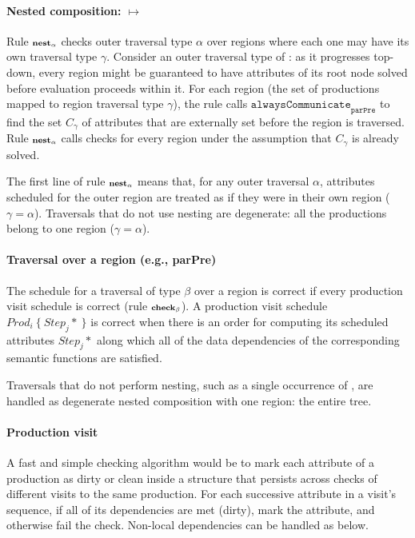\paragraph*{Nested composition: $\mapsto$}
Rule ${\scriptstyle\textbf {nest}_\alpha}$ checks outer traversal type $\alpha$ over regions where each one may have its own traversal type $\gamma$. Consider an outer traversal type of  : as it progresses top-down, every region might be guaranteed to have attributes of its root node solved before evaluation proceeds within it. For each region (the set of productions mapped to region traversal type $\gamma$), the rule calls $\texttt{alwaysCommunicate}_{\texttt{parPre}}$ to find the set $C_\gamma$ of  attributes that are externally set before the region is traversed. Rule ${\scriptstyle\textbf {nest}_\alpha}$ calls checks for every region under the assumption that $C_\gamma$ is already solved.

The first line of rule ${\scriptstyle\textbf {nest}_\alpha}$ means that, for any outer traversal $\alpha$, attributes scheduled for the outer region are  treated as if they were in their own region ($\gamma = \alpha$). Traversals that do not use nesting are degenerate:  all the productions belong to one region ($\gamma = \alpha$).

\paragraph*{Traversal over a region (e.g., parPre)}
The schedule for a traversal of type $\beta$ over a region is correct if every production visit schedule is correct (rule ${\scriptstyle\textbf {check}_\beta}$). A production visit schedule $Prod_i~\{~Step_j*~\}$ is correct when there is an order for computing its scheduled attributes $Step_j*$ along which all of the data dependencies of the corresponding semantic functions are satisfied. %

Traversals that do not perform nesting, such as a single occurrence of , are handled as degenerate nested composition with one region: the entire tree.

\paragraph*{Production visit}

A fast and simple checking algorithm would be to mark each attribute  of a production as dirty or clean inside a structure that persists across checks of different visits to the same production. For each successive attribute in a visit's sequence, if all of its dependencies are met (dirty), mark the attribute, and otherwise fail the check. Non-local dependencies can be handled as below.


